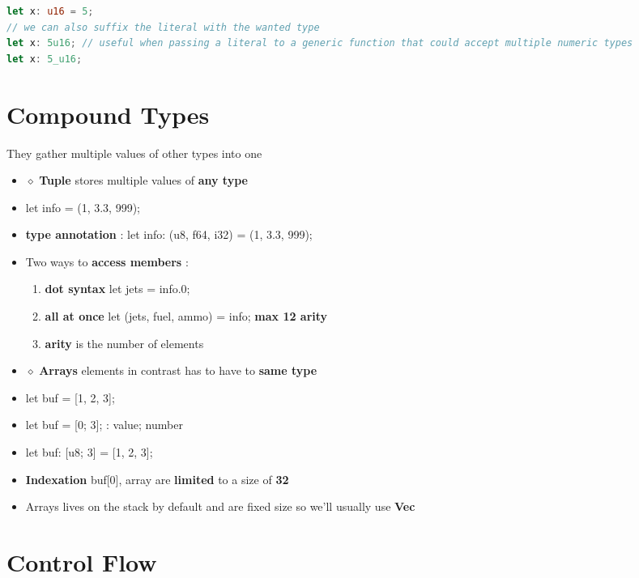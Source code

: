 \documentclass{report}
\begin{document}
\begin{multicols*}{2}
\begin{tcolorbox}[title=Suffixe variable type,colback=backcolour,size=small,left=4mm]
\begin{lstlisting}[language=rust]
let x: u16 = 5;
// we can also suffix the literal with the wanted type
let x: 5u16; // useful when passing a literal to a generic function that could accept multiple numeric types
let x: 5_u16;
\end{lstlisting}
\end{tcolorbox}

\section{Compound Types}

They gather multiple values of other types into one

\begin{itemize}
  \item $\diamond$ \textbf{Tuple} stores multiple values of \textbf{any type} 
  \item let info = (1, 3.3, 999); 
  \item \textbf{type annotation} : let info: (u8, f64, i32) = (1, 3.3, 999); 
  \item Two ways to \textbf{access members} :
    \begin{enumerate}
      \item \textbf{dot syntax} let jets = info.0; 
      \item \textbf{all at once} let (jets, fuel, ammo) = info; \textbf{max 12 arity} 
      \item \textbf{arity} is the number of elements
    \end{enumerate}
  \item $\diamond $ \textbf{Arrays} elements in contrast has to have to \textbf{same type} 
  \item let buf = [1, 2, 3]; 
  \item let buf = [0; 3]; : value; number 
  \item let buf: [u8; 3] = [1, 2, 3]; 
  \item \textbf{Indexation} buf[0], array are \textbf{limited} to a size of \textbf{32} 
  \item Arrays lives on the stack by default and are fixed size so we'll usually use \textbf{Vec} 
\end{itemize}

\section{Control Flow}


\end{multicols*}
\end{document}
